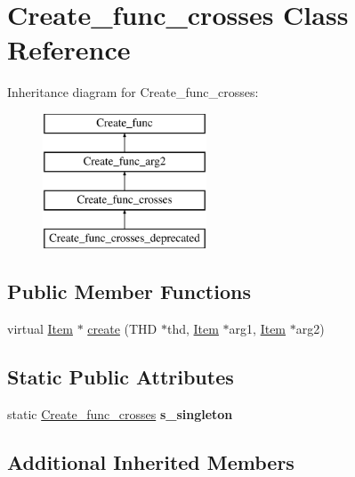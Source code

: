 \hypertarget{classCreate__func__crosses}{}\section{Create\+\_\+func\+\_\+crosses Class Reference}
\label{classCreate__func__crosses}
Inheritance diagram for Create\+\_\+func\+\_\+crosses\+:\begin{figure}[H]
\begin{center}
\leavevmode
\includegraphics[height=4.000000cm]{classCreate__func__crosses}
\end{center}
\end{figure}
\subsection*{Public Member Functions}
\begin{DoxyCompactItemize}
\item 
virtual \mbox{\hyperlink{classItem}{Item}} $\ast$ \mbox{\hyperlink{classCreate__func__crosses_a6e70127aa142416341cc918ecffe11a5}{create}} (T\+HD $\ast$thd, \mbox{\hyperlink{classItem}{Item}} $\ast$arg1, \mbox{\hyperlink{classItem}{Item}} $\ast$arg2)
\end{DoxyCompactItemize}
\subsection*{Static Public Attributes}
\begin{DoxyCompactItemize}
\item 
\mbox{\label{classCreate__func__crosses_a7c012a871f08bbf0b01e41e558fab1c1}} 
static \mbox{\hyperlink{classCreate__func__crosses}{Create\+\_\+func\+\_\+crosses}} {\bfseries s\+\_\+singleton}
\end{DoxyCompactItemize}
\subsection*{Additional Inherited Members}


